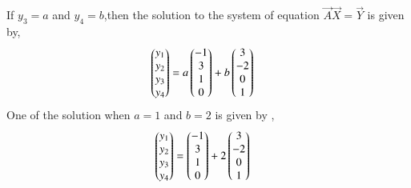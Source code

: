 If $y_3=a$ and $y_4=b$,then the solution to the system of equation $\vec{A}\vec{X}=\vec{Y}$ is given by,
\begin{align}
    \begin{pmatrix}y_1\\y_2\\y_3\\y_4\end{pmatrix}&=a\begin{pmatrix}-1\\3\\1\\0\end{pmatrix}+b\begin{pmatrix}3\\-2\\0\\1\end{pmatrix}
\end{align}
One of the solution when $a=1$ and $b=2$  is given by , 
\begin{align}
    \begin{pmatrix}y_1\\y_2\\y_3\\y_4\end{pmatrix}&=\begin{pmatrix}-1\\3\\1\\0\end{pmatrix}+2\begin{pmatrix}3\\-2\\0\\1\end{pmatrix}
\end{align}
